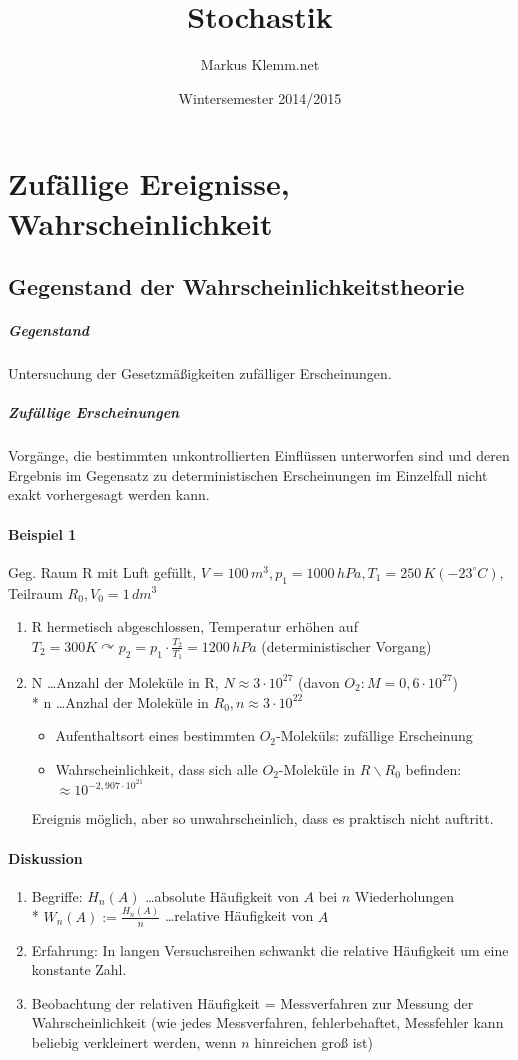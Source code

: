 \documentclass[a4paper]{scrartcl}
\title{Stochastik}
\date{Wintersemester 2014/2015}
\author{Markus Klemm.net}
\begin{document}
\maketitle
\tableofcontents

\section{Zufällige Ereignisse, Wahrscheinlichkeit}
\subsection{Gegenstand der Wahrscheinlichkeitstheorie}
\subparagraph{Gegenstand} Untersuchung der Gesetzmäßigkeiten zufälliger Erscheinungen.
\subparagraph{Zufällige Erscheinungen} Vorgänge, die bestimmten unkontrollierten Einflüssen unterworfen sind und deren Ergebnis im Gegensatz zu deterministischen Erscheinungen im Einzelfall nicht exakt vorhergesagt werden kann.

\paragraph{Beispiel 1} Geg. Raum R mit Luft gefüllt, $V= 100 \, m^3, p_1 = 1000 \,hPa, T_1 = 250 \, K (-23 ^\circ C)$, Teilraum $R_0, V_0 = 1 \, dm^3$
\begin{enumerate}
\item R hermetisch abgeschlossen, Temperatur erhöhen auf $T_2 = 300 K \curvearrowright p_2 = p_1 \cdot \frac{T_2}{T_1} = 1200 \, hPa$ (deterministischer Vorgang)
\item N \dots Anzahl der Moleküle in R, $N \approx 3 \cdot 10^{27} $ (davon $O_2: M = 0,6\cdot 10^{27}$)\\*
n \dots Anzhal der Moleküle in  $R_0, n \approx 3 \cdot 10^{22}$
\begin{itemize}
\item Aufenthaltsort eines bestimmten $O_2$-Moleküls: zufällige Erscheinung
\item Wahrscheinlichkeit, dass sich alle $O_2$-Moleküle in $R \backslash R_0$ befinden: $\approx 10^{-2,907 \cdot 10^{21}}$
\end{itemize}
Ereignis möglich, aber so unwahrscheinlich, dass es praktisch nicht auftritt.
\end{enumerate}

\paragraph{Diskussion}
\begin{enumerate}
\item Begriffe: $H_n (A)$ \dots absolute Häufigkeit von $A$ bei $n$ Wiederholungen\\*
$W_n (A) := \frac{H_n (A)}{n}$ \dots relative Häufigkeit von $A$
\item Erfahrung: In langen Versuchsreihen schwankt die relative Häufigkeit um eine konstante Zahl.
\item Beobachtung der relativen Häufigkeit = Messverfahren zur Messung der Wahrscheinlichkeit (wie jedes Messverfahren, fehlerbehaftet, Messfehler kann beliebig verkleinert werden, wenn $n$ hinreichen groß ist)
\end{enumerate}
\end{document}
